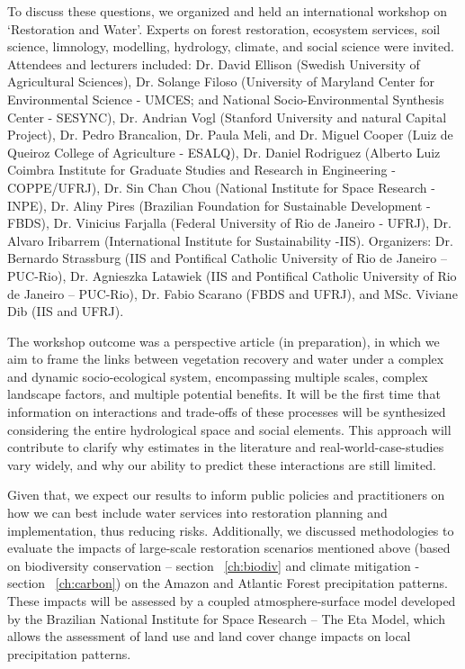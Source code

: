 \indent To discuss these questions, we organized and held an international workshop on ‘Restoration and Water’. Experts on forest restoration, ecosystem services, soil science, limnology, modelling, hydrology, climate, and social science were invited. Attendees and lecturers included: Dr. David Ellison (Swedish University of Agricultural Sciences), Dr. Solange Filoso (University of Maryland Center for Environmental Science - UMCES; and National Socio-Environmental Synthesis Center - SESYNC), Dr. Andrian Vogl (Stanford University and natural Capital Project), Dr. Pedro Brancalion, Dr. Paula Meli, and Dr. Miguel Cooper (Luiz de Queiroz College of Agriculture - ESALQ), Dr. Daniel Rodriguez (Alberto Luiz Coimbra Institute for Graduate Studies and Research in Engineering - COPPE/UFRJ), Dr. Sin Chan Chou (National Institute for Space Research - INPE), Dr. Aliny Pires (Brazilian Foundation for Sustainable Development - FBDS), Dr. Vinicius Farjalla (Federal University of Rio de Janeiro - UFRJ), Dr. Alvaro Iribarrem (International Institute for Sustainability -IIS). Organizers: Dr. Bernardo Strassburg (IIS and Pontifical Catholic University of Rio de Janeiro – PUC-Rio), Dr. Agnieszka Latawiek (IIS and Pontifical Catholic University of Rio de Janeiro – PUC-Rio), Dr. Fabio Scarano (FBDS and UFRJ), and MSc. Viviane Dib (IIS and UFRJ).

The workshop outcome was a perspective article (in preparation), in which we aim to frame the links between vegetation recovery and water under a complex and dynamic socio-ecological system, encompassing multiple scales, complex landscape factors, and multiple potential benefits. It will be the first time that information on interactions and trade-offs of these processes will be synthesized considering the entire hydrological space and social elements. This approach will contribute to clarify why estimates in the literature and real-world-case-studies vary widely, and why our ability to predict these interactions are still limited. 

Given that, we expect our results to inform public policies and practitioners on how we can best include water services into restoration planning and implementation, thus reducing risks. Additionally, we discussed methodologies to evaluate the impacts of large-scale restoration scenarios mentioned above (based on biodiversity conservation – section ~\ref{ch:biodiv} and climate mitigation - section ~\ref{ch:carbon}) on the Amazon and Atlantic Forest precipitation patterns. These impacts will be assessed by a coupled atmosphere-surface model developed by the Brazilian National Institute for Space Research – The Eta Model, which allows the assessment of land use and land cover change impacts on local precipitation patterns. 


